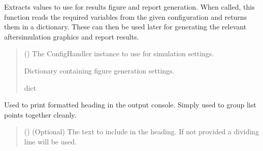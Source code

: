 \documentclass[letterpaper,10pt,english]{sphinxmanual}
\begin{document}
\begin{fulllineitems}
\label{\detokenize{modules/input/config:qnav.input.config.get_figure_settings}}
\pysigstartsignatures
{}
\pysigstopsignatures
\sphinxAtStartPar
Extracts values to use for results figure and report generation.
When called, this function reads the required variables from the
given configuration and returns them in a dictionary. These can
then be used later for generating the relevant after\sphinxhyphen{}simulation
graphics and report results.
\begin{quote}\begin{description}
\sphinxAtStartPar
{} ({\hyperref[\detokenize{modules/input/config_handler:qnav.input.config_handler.ConfigHandler}]{}}) \textendash{} The ConfigHandler instance to use for simulation settings.

\sphinxAtStartPar
Dictionary containing figure generation settings.

\sphinxAtStartPar
dict

\end{description}\end{quote}

\end{fulllineitems}


\begin{fulllineitems}
\label{\detokenize{modules/input/config:qnav.input.config.print_banner}}
\pysigstartsignatures
{}
\pysigstopsignatures
\sphinxAtStartPar
Used to print formatted heading in the output console.
Simply used to group list points together cleanly.
\begin{quote}\begin{description}
\sphinxAtStartPar
{} () \textendash{} (Optional) The text to include in the heading.
If not provided a dividing line will be used.

\end{description}\end{quote}

\end{fulllineitems}
\end{document}
